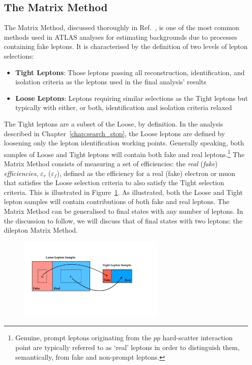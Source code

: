 \subsection{The Matrix Method}
\label{sec:matrix_method}

The Matrix Method, discussed thoroughly in Ref.~\cite{TOPFake}, is one of the most common
methods used in ATLAS analyses for estimating backgrounds due to processes containing
fake leptons.
It is characterised by the definition of two levels of lepton selections:
\begin{itemize}
    \item[]\textbf{Tight Leptons}: Those leptons passing all reconstruction, identification, and isolation criteria
        as the leptons used in the final analysis' results
    \item[]\textbf{Loose Leptons}: Leptons requiring similar selections as the Tight leptons but typically with either, or both, identification
        and isolation criteria relaxed
\end{itemize}
The Tight leptons are a subset of the Loose, by definition.
In the analysis described in Chapter~\ref{chap:search_stop}, the Loose leptons are defined by loosening
only the lepton identification working points.
Generally speaking, both samples of Loose and Tight leptons will contain
both fake and real leptons.\footnote{Genuine, prompt
leptons originating from the $pp$ hard-scatter interaction point are typically referred to as `real' leptons
in order to distinguish them, semantically, from fake and non-prompt leptons.
}
The Matrix Method consists of measuring a set of efficiencies: the \textit{real}
(\textit{fake}) \textit{efficiencies}, $\varepsilon_r$ ($\varepsilon_f$),
defined as the efficiency for a real (fake) electron or muon that satisfies the Loose selection criteria
to also satisfy the Tight selection criteria.
This is illustrated in Figure~\ref{fig:fake_effs}.
As illustrated, both the Loose and Tight lepton samples will contain contributions of both fake
and real leptons.
The Matrix Method can be generalised to final states with any number of leptons.
In the discussion to follow, we will discuss that of final states with two leptons: the dilepton Matrix Method.

\begin{figure}[!htb]
    \begin{center}
        \includegraphics[width=0.65\textwidth]{figures/common_ana/fakes/fake_effs_illustration}
        \caption{
        }
        \label{fig:fake_effs}
    \end{center}
\end{figure}


